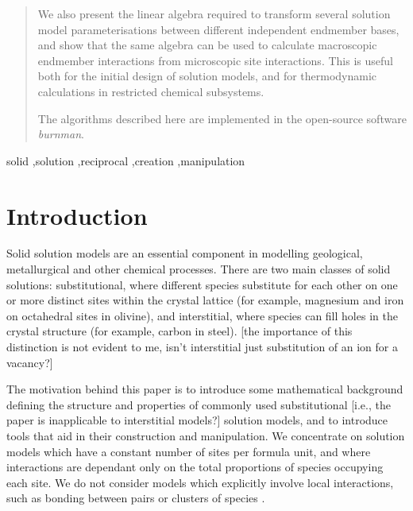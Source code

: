 \documentclass[preprint,12pt]{elsarticle}
\begin{document}
\begin{frontmatter}
\begin{abstract}
We also present the linear algebra required to transform several solution model parameterisations between different independent endmember bases, and show that the same algebra can be used to calculate macroscopic endmember interactions from microscopic site interactions. This is useful both for the initial design of solution models, and for thermodynamic calculations in restricted chemical subsystems.

The algorithms described here are implemented in the open-source software \emph{burnman}.
\end{abstract}

\begin{keyword}
solid \sep solution \sep reciprocal \sep creation \sep manipulation


\end{keyword}

\end{frontmatter}

\linenumbers

\section{Introduction}
\label{sec:introduction}

 Solid solution models are an essential component in modelling geological, metallurgical and other chemical processes. There are two main classes of solid solutions: substitutional, where different species substitute for each other on one or more distinct sites within the crystal lattice (for example, magnesium and iron on octahedral sites in olivine), and interstitial, where species can fill holes in the crystal structure (for example, carbon in steel). [the importance of this distinction is not evident to me, isn't interstitial just substitution of an ion for a vacancy?]

The motivation behind this paper is to introduce some mathematical background defining the structure and properties of commonly used substitutional [i.e., the paper is inapplicable to interstitial models?] solution models, and to introduce tools that aid in their construction and manipulation. We concentrate on solution models which have a constant number of sites per formula unit, and where interactions are dependant only on the total proportions of species occupying each site. We do not consider models which explicitly involve local interactions, such as bonding between pairs or clusters of species \citep[e.g.][]{Bethe1935,Inden2001}.
\end{document}
